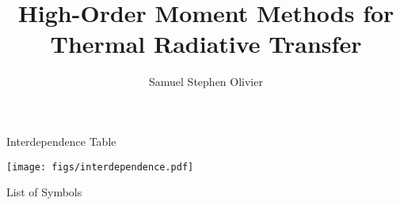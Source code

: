 \documentclass[todo]{dissertation}
\begin{document}
\title{High-Order Moment Methods for Thermal Radiative Transfer}
\author{Samuel Stephen Olivier}
\maketitle

\copyrightpage



\begin{frontmatter}

\begin{KeepFromToc}
\tableofcontents
\end{KeepFromToc}
\clearpage

\begin{preamble}{Interdependence Table}
\vfill
\begin{center}
\label{preamble:interdependence}
\texttt{[image: figs/interdependence.pdf]}
\end{center}
\end{preamble}

\printglossary[style=april_gloss_style]
\clearpage

\begin{preamble}{List of Symbols}

\end{preamble}


\begin{preamble}{\acknowledgename}

\end{preamble}
\end{frontmatter}

\glsresetall %
\pagestyle{headings}










\glsresetall %

\clearpage
\printbibliography
\appendix 

\end{document}
